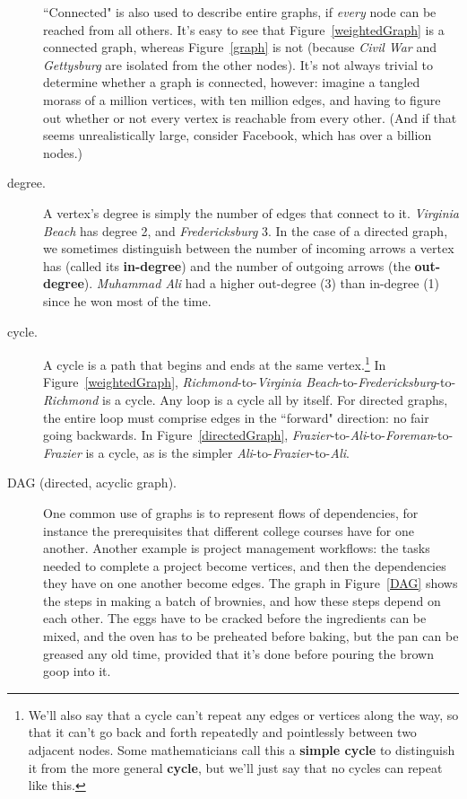 \begin{description}
``Connected" is also used to describe entire graphs, if \textit{every}
node can be reached from all others. It's easy to see that
Figure~\ref{weightedGraph} is a connected graph, whereas Figure~\ref{graph}
is not (because \textsl{Civil War} and \textsl{Gettysburg} are isolated
from the other nodes). It's not always trivial to determine whether a graph
is connected, however: imagine a tangled morass of a million vertices, with
ten million edges, and having to figure out whether or not every vertex is
reachable from every other. (And if that seems unrealistically large,
consider Facebook, which has over a billion nodes.)

\item[degree.] A vertex's degree is simply the number of edges that connect
to it. \textsl{Virginia Beach} has degree 2, and \textsl{Fredericksburg} 3.
In the case of a directed graph, we sometimes distinguish between the
number of incoming arrows a vertex has (called its \textbf{in-degree}) and
the number of outgoing arrows (the \textbf{out-degree}). \textsl{Muhammad
Ali} had a higher out-degree (3) than in-degree (1) since he won most of
the time.

\item[cycle.] A cycle is a path that begins and ends at the same
vertex.\footnote{We'll also say that a cycle can't repeat any edges or
vertices along the way, so that it can't go back and forth repeatedly and
pointlessly between two adjacent nodes. Some mathematicians call this a
\textbf{simple cycle} to distinguish it from the more general
\textbf{cycle}, but we'll just say that no cycles can repeat like this.} In
Figure~\ref{weightedGraph}, \textsl{Richmond}-to-\textsl{Virginia
Beach}-to-\textsl{Fredericksburg}-to-\textsl{Richmond} is a cycle.  Any
loop is a cycle all by itself. For directed graphs, the entire loop must
comprise edges in the ``forward" direction: no fair going backwards. In
Figure~\ref{directedGraph},
\textsl{Frazier}-to-\textsl{Ali}-to-\textsl{Foreman}-to-\textsl{Frazier}
is a cycle, as is the simpler
\textsl{Ali}-to-\textsl{Frazier}-to-\textsl{Ali}.

\item[DAG (directed, acyclic graph).] One common use of graphs is to
represent flows of dependencies, for instance the prerequisites that
different college courses have for one another. Another example is project
management workflows: the tasks needed to complete a project become
vertices, and then the dependencies they have on one another become edges.
The graph in Figure~\ref{DAG} shows the steps in making a batch of
brownies, and how these steps depend on each other. The eggs have to be
cracked before the ingredients can be mixed, and the oven has to be
preheated before baking, but the pan can be greased any old time, provided
that it's done before pouring the brown goop into it.


\end{description}

